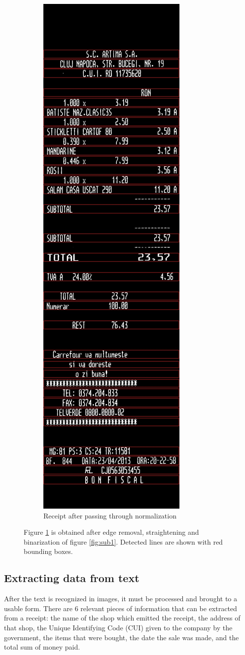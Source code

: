 \begin{figure}
\begin{subfigure}{0.45\linewidth}
\end{subfigure}%
\begin{subfigure}{0.45\linewidth}
  \centering
  \includegraphics[width=.4\linewidth]{img/cleaned1.jpg}
  \caption{Receipt after passing through normalization}
  \label{fig:sub2}
\end{subfigure}
\caption{\label{fig:receipts}
Figure \ref{fig:sub2} is obtained after edge removal, straightening and binarization of figure \ref{fig:sub1}. Detected lines are shown with red bounding boxes.}
\label{fig:test}
\end{figure}

\subsection{Extracting data from text}
After the text is recognized in images, it must be processed and brought to a usable form. There are 6 relevant pieces of information that can be extracted from a receipt: the name of the shop which emitted the receipt, the address of that shop, the Unique Identifying Code (CUI) given to the company by the government, the items that were bought, the date the sale was made, and the total sum of money paid. 

